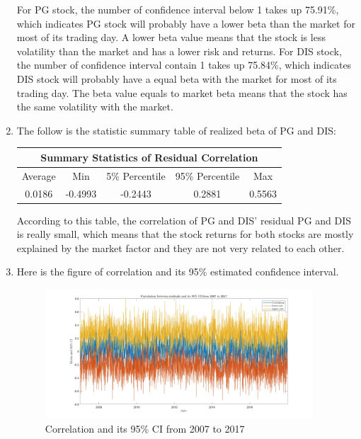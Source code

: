 \documentclass[12pt,letterpaper]{article}
\begin{document}
\begin{enumerate}[label=\textbf{(\Alph*)}]
For PG stock, the number of confidence interval below 1 takes up 75.91\%, which indicates PG stock will probably have a lower beta than the market for most of its trading day. A lower beta value means that the stock is less volatility than the market and has a lower risk and returns. For DIS stock, the number of confidence interval contain 1 takes up 75.84\%, which indicates DIS stock will probably have a equal beta with the market for most of its trading day. The beta value equals to market beta means that the stock has the same volatility with the market.


\item The follow is the statistic summary table of realized beta of PG and DIS:
\begin{table}[ht]
\centering %
\begin{tabular}{ccccc} %
\hline\hline %
\multicolumn{5}{c}{Summary Statistics of Residual Correlation}\\ [0.5ex]%
\hline  Average & Min & 5\% Percentile & 95\% Percentile & Max\\
\hline
0.0186 & -0.4993 & -0.2443 & 0.2881 & 0.5563\\
\hline %
\end{tabular}
\end{table}

According to this table, the correlation of PG and DIS' residual PG and DIS is really small, which means that the stock returns for both stocks are mostly explained by the market factor and they are not very related to each other.\\

\item Here is the figure of correlation and its 95\% estimated confidence interval.

\begin{figure}[H]
           \centering
            \includegraphics[width=10cm]{figures/q3_f.jpg}
            \centering
            \caption{Correlation and its 95\% CI from 2007 to 2017}
\end{figure}


\end{enumerate}
\end{document}
